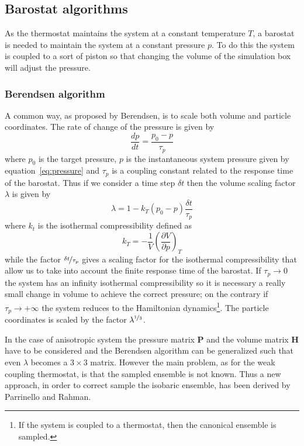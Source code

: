 \subsection{Barostat algorithms} %
As the thermostat maintains the system at a constant temperature $T$, a barostat is needed to maintain the system 
at a constant pressure $p$. To do this the system is coupled to a sort of piston so that changing the volume of 
the simulation box will adjust the pressure.

\subsubsection{Berendsen algorithm}
A common way, as proposed by Berendsen, is to scale both volume and particle coordinates. The rate of change of 
the pressure is given by
\begin{equation*}
	\frac{dp}{dt} = \frac{p_0 - p}{\tau_p}
\end{equation*}
where $p_0$ is the target pressure, $p$ is the instantaneous system pressure given by 
equation~\eqref{eq:pressure} and $\tau_p$ is a coupling constant related to the response time of the barostat. 
Thus if we consider a time step $\delta t$ then the volume scaling factor $\lambda$ is given by
\begin{equation*}
	\lambda = 1- k_T (p_0 - p) \frac{\delta t}{\tau_p}
\end{equation*}
where $k_t$ is the isothermal compressibility defined as
\begin{equation*}
	k_T = -\frac{1}{V}\left ( \frac{\partial V}{\partial p}\right )_{T}
\end{equation*}
while the factor $\nicefrac{\delta t}{\tau_p}$ gives a scaling factor for the isothermal compressibility that 
allow us to take into account the finite response time of the barostat. If $\tau_p \rightarrow 0$ the system has 
an infinity isothermal compressibility so it is necessary a really small change in volume to achieve the correct 
pressure; on the contrary if $\tau_p \rightarrow +\infty$ the system reduces to the Hamiltonian 
dynamics\footnote{If the system is coupled to a thermostat, then the canonical ensemble is sampled.}. The 
particle coordinates is scaled by the factor $\lambda^{\nicefrac{1}{3}}$.  

In the case of anisotropic system the pressure matrix $\mathbold{P}$ and the volume matrix $\mathbold{H}$ have to 
be considered and the Berendsen algorithm can be generalized such that even $\lambda$ becomes a $3\times 3$ 
matrix. However the main problem, as for the weak coupling thermostat, is that the sampled ensemble is not known. 
Thus a new approach, in order to correct sample the isobaric ensemble, has been derived by Parrinello and Rahman.

